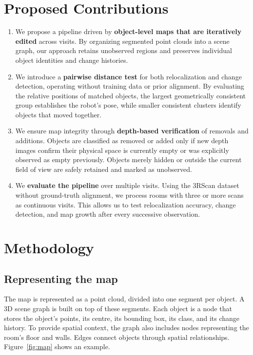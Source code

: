 \documentclass[11pt, a4paper]{article}
\begin{document}
\section{Proposed Contributions}\label{sec:contrib}
\begin{enumerate}[label=C\arabic*., leftmargin=*, itemsep=2pt, topsep=3pt]
  \item We propose a pipeline driven by \textbf{object-level maps that are iteratively edited} across visits. By organizing segmented point clouds into a scene graph, our approach retains unobserved regions and preserves individual object identities and change histories. 
  \item We introduce a \textbf{pairwise distance test} for both relocalization and change detection, operating without training data or prior alignment. By evaluating the relative positions of matched objects, the largest geometrically consistent group establishes the robot's pose, while smaller consistent clusters identify objects that moved together.
  \item We ensure map integrity through \textbf{depth-based verification} of removals and additions. Objects are classified as removed or added only if new depth images confirm their physical space is currently empty or was explicitly observed as empty previously. Objects merely hidden or outside the current field of view are safely retained and marked as unobserved.
  \item We \textbf{evaluate the pipeline} over multiple visits. Using the 3RScan dataset without ground-truth alignment, we process rooms with three or more scans as continuous visits. This allows us to test relocalization accuracy, change detection, and map growth after every successive observation.
\end{enumerate}

\section{Methodology}

\subsection{Representing the map}
The map is represented as a point cloud, divided into one segment per object. A 3D scene graph is built on top of these segments. Each object is a node that stores the object's points, its centre, its bounding box, its class, and its change history. To provide spatial context, the graph also includes nodes representing the room's floor and walls. Edges connect objects through spatial relationships. Figure~\ref{fig:map} shows an example.
\end{document}
